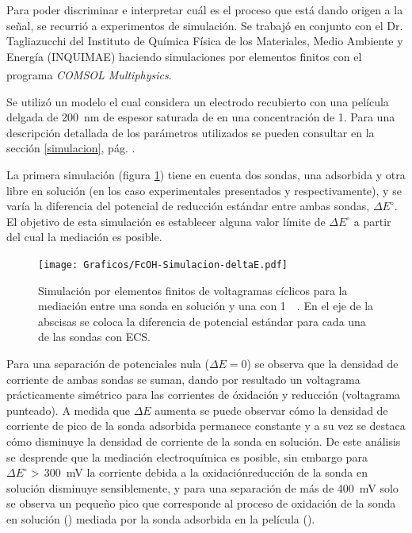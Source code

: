		Para poder discriminar e interpretar cuál es el proceso que está dando origen a la señal, se recurrió a experimentos de simulación. Se trabajó en conjunto con el Dr. Tagliazucchi del Instituto de Química Física de los Materiales, Medio Ambiente y Energía (INQUIMAE) haciendo simulaciones por elementos finitos con el programa \textit{COMSOL Multiphysics\textsuperscript\textregistered}.

		Se utilizó un modelo el cual considera un electrodo recubierto con una película delgada de \SI{200}{nm} de espesor saturada de  \aminorutenio en una concentración de \SI{1}{\Molar}. Para una descripción detallada de los parámetros utilizados se pueden consultar en la sección \ref{simulacion}, pág. \pageref{simulacion}. 

		La primera simulación (figura \ref{fig:sim_mediacion}) tiene en cuenta dos sondas, una adsorbida y otra libre en solución (en los caso experimentales presentados \ru\space y \fc\space respectivamente), y se varía la diferencia del potencial de reducción estándar entre ambas sondas, $\Delta E^\circ$. El objetivo de esta simulación es establecer alguna valor límite de $\Delta E^\circ$ a partir del cual la mediación es posible. 

			\begin{figure}[h!]
					\centering
					\vspace*{-2mm}
			 	    \texttt{[image: Graficos/FcOH-Simulacion-deltaE.pdf]}
			 	    \vspace*{-3mm}
			        \caption[Simulación EQ de mediación rédox]{Simulación por elementos finitos de voltagramas cíclicos para la mediación entre una sonda en solución y una \pdmF\space con \ru\space \SI{1}{\milli\Molar}. En el eje de la abscisas se coloca la diferencia de potencial estándar para cada una de las sondas con ECS.}
			        \label{fig:sim_mediacion}\vspace*{3mm}
			      	\end{figure}

		Para una separación de potenciales nula ($\Delta E=0$) se observa que la densidad de corriente de ambas sondas se suman, dando por resultado un voltagrama prácticamente simétrico para las corrientes de óxidación y reducción (voltagrama punteado). A medida que $\Delta E$ aumenta se puede observar cómo la densidad de corriente de pico de la sonda adsorbida permanece constante y a su vez se destaca cómo disminuye la densidad de corriente de la sonda en solución. De este análisis se desprende que la mediación electroquímica es posible, sin embargo para $\Delta E^\circ\!\!>\,$\SI{300}{\milli\volt} la corriente debida a la oxidación\textbar reducción de la sonda en solución disminuye sensiblemente, y para una separación de más de \SI{400}{\milli\volt} solo se observa un pequeño pico que corresponde al proceso de oxidación de la sonda en solución (\fc) mediada por la sonda adsorbida en la película (\ru). %


